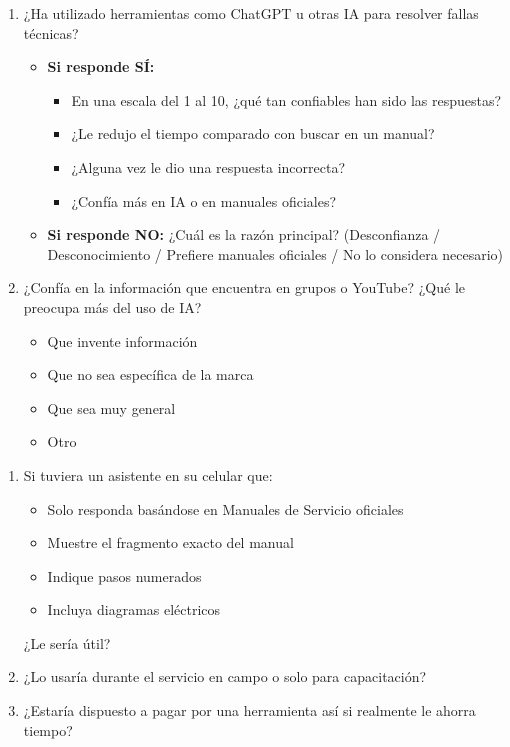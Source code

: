 {{    

    \begin{enumerate}[label=\arabic*., leftmargin=*, nosep, start=13]
        \item ¿Ha utilizado herramientas como ChatGPT u otras IA para resolver fallas técnicas?
        \begin{itemize}[nosep, leftmargin=*]
            \item \textbf{Si responde SÍ:}
            \begin{itemize}[nosep, leftmargin=*]
                \item En una escala del 1 al 10, ¿qué tan confiables han sido las respuestas?
                \item ¿Le redujo el tiempo comparado con buscar en un manual?
                \item ¿Alguna vez le dio una respuesta incorrecta?
                \item ¿Confía más en IA o en manuales oficiales?
            \end{itemize}
            \item \textbf{Si responde NO:} ¿Cuál es la razón principal? (Desconfianza / Desconocimiento / Prefiere manuales oficiales / No lo considera necesario)
        \end{itemize}
        \item ¿Confía en la información que encuentra en grupos o YouTube? ¿Qué le preocupa más del uso de IA?
        \begin{itemize}[nosep, leftmargin=*]
            \item Que invente información
            \item Que no sea específica de la marca
            \item Que sea muy general
            \item Otro
        \end{itemize}
    \end{enumerate}


    \begin{enumerate}[label=\arabic*., leftmargin=*, nosep, start=15]
        \item Si tuviera un asistente en su celular que:
        \begin{itemize}[nosep, leftmargin=*]
            \item Solo responda basándose en Manuales de Servicio oficiales
            \item Muestre el fragmento exacto del manual
            \item Indique pasos numerados
            \item Incluya diagramas eléctricos
        \end{itemize}
        ¿Le sería útil?
        \item ¿Lo usaría durante el servicio en campo o solo para capacitación?
        \item ¿Estaría dispuesto a pagar por una herramienta así si realmente le ahorra tiempo?
    \end{enumerate}

}}
